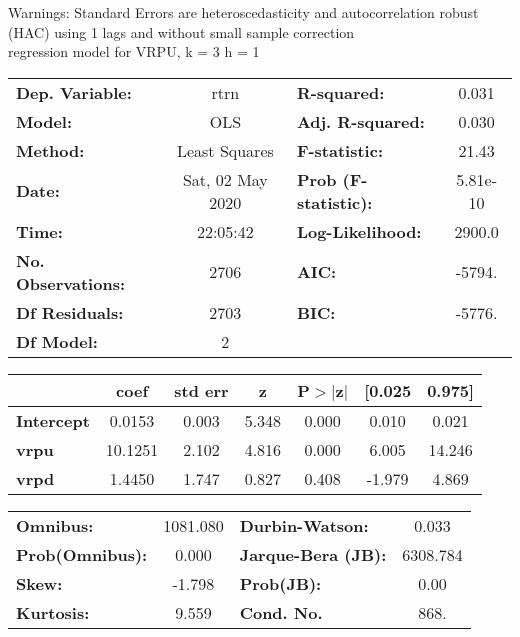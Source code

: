 Warnings: \newline
 [1] Standard Errors are heteroscedasticity and autocorrelation robust (HAC) using 1 lags and without small sample correction\\ 

regression model for VRPU, k = 3 h = 1\begin{center}
\begin{tabular}{lclc}
\toprule
\textbf{Dep. Variable:}    &       rtrn       & \textbf{  R-squared:         } &     0.031   \\
\textbf{Model:}            &       OLS        & \textbf{  Adj. R-squared:    } &     0.030   \\
\textbf{Method:}           &  Least Squares   & \textbf{  F-statistic:       } &     21.43   \\
\textbf{Date:}             & Sat, 02 May 2020 & \textbf{  Prob (F-statistic):} &  5.81e-10   \\
\textbf{Time:}             &     22:05:42     & \textbf{  Log-Likelihood:    } &    2900.0   \\
\textbf{No. Observations:} &        2706      & \textbf{  AIC:               } &    -5794.   \\
\textbf{Df Residuals:}     &        2703      & \textbf{  BIC:               } &    -5776.   \\
\textbf{Df Model:}         &           2      & \textbf{                     } &             \\
\bottomrule
\end{tabular}
\begin{tabular}{lcccccc}
                   & \textbf{coef} & \textbf{std err} & \textbf{z} & \textbf{P$> |$z$|$} & \textbf{[0.025} & \textbf{0.975]}  \\
\midrule
\textbf{Intercept} &       0.0153  &        0.003     &     5.348  &         0.000        &        0.010    &        0.021     \\
\textbf{vrpu}      &      10.1251  &        2.102     &     4.816  &         0.000        &        6.005    &       14.246     \\
\textbf{vrpd}      &       1.4450  &        1.747     &     0.827  &         0.408        &       -1.979    &        4.869     \\
\bottomrule
\end{tabular}
\begin{tabular}{lclc}
\textbf{Omnibus:}       & 1081.080 & \textbf{  Durbin-Watson:     } &    0.033  \\
\textbf{Prob(Omnibus):} &   0.000  & \textbf{  Jarque-Bera (JB):  } & 6308.784  \\
\textbf{Skew:}          &  -1.798  & \textbf{  Prob(JB):          } &     0.00  \\
\textbf{Kurtosis:}      &   9.559  & \textbf{  Cond. No.          } &     868.  \\
\bottomrule
\end{tabular}
\end{center}

